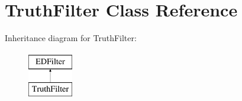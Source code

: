 \hypertarget{classTruthFilter}{\section{Truth\-Filter Class Reference}
\label{classTruthFilter}
}
Inheritance diagram for Truth\-Filter\-:\begin{figure}[H]
\begin{center}
\leavevmode
\includegraphics[height=2.000000cm]{classTruthFilter}
\end{center}
\end{figure}
